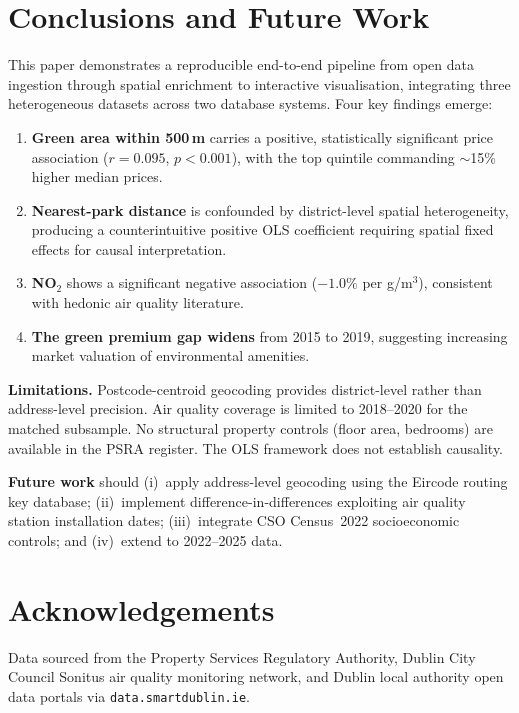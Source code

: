 \documentclass[conference]{IEEEtran}
\begin{document}
\section{Conclusions and Future Work}
\label{sec:conclusion}

This paper demonstrates a reproducible end-to-end pipeline from open data
ingestion through spatial enrichment to interactive visualisation, integrating
three heterogeneous datasets across two database systems. Four key findings
emerge:

\begin{enumerate}
  \item \textbf{Green area within 500\,m} carries a positive, statistically
        significant price association ($r = 0.095$, $p < 0.001$),
        with the top quintile commanding $\sim$15\% higher median prices.
  \item \textbf{Nearest-park distance} is confounded by district-level
        spatial heterogeneity, producing a counterintuitive positive OLS
        coefficient requiring spatial fixed effects for causal interpretation.
  \item \textbf{NO$_2$} shows a significant negative association ($-1.0\%$
        per \textmu g/m$^3$), consistent with hedonic air quality literature.
  \item \textbf{The green premium gap widens} from 2015 to 2019,
        suggesting increasing market valuation of environmental amenities.
\end{enumerate}

\textbf{Limitations.} Postcode-centroid geocoding provides district-level
rather than address-level precision. Air quality coverage is limited to
2018--2020 for the matched subsample. No structural property controls
(floor area, bedrooms) are available in the PSRA register. The OLS
framework does not establish causality.

\textbf{Future work} should (i)~apply address-level geocoding using the
Eircode routing key database; (ii)~implement difference-in-differences
exploiting air quality station installation dates; (iii)~integrate CSO
Census~2022 socioeconomic controls; and (iv)~extend to 2022--2025 data.

\section*{Acknowledgements}

Data sourced from the Property Services Regulatory Authority, Dublin City
Council Sonitus air quality monitoring network, and Dublin local authority
open data portals via \texttt{data.smartdublin.ie}.



\end{document}
